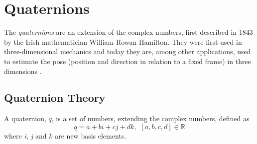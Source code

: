 \documentclass{LTHthesis}
\begin{document}
\section{Quaternions}
%
The \emph{quaternions} are an extension of the complex numbers, first described in 1843 by the Irish mathematician William Rowan Hamilton. They were first used in three-dimensional mechanics and today they are, among other applications, used to estimate the pose (position and direction in relation to a fixed frame) in three dimensions \cite{kuip98,mann13}.
%
\subsection{Quaternion Theory}
%
A quaternion, $q$, is a set of numbers, extending the complex numbers, defined as
%
\begin{equation}
q = a+bi+cj+dk, \hspace{5pt}[a,b,c,d]\in \mathbb R
\end{equation} 
%
where \emph{i, j} and $k$ are new basis elements.
\end{document}
